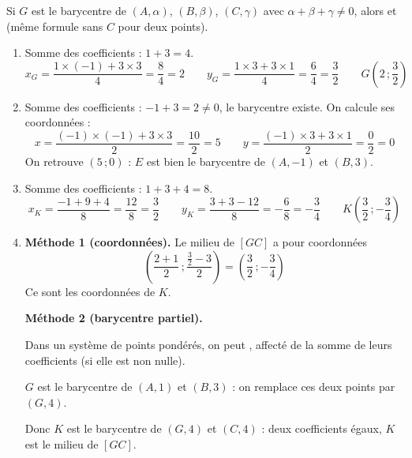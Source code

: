 \begin{center}
\end{center}
\begin{prop}
Si $G$ est le barycentre de $(A,\alpha)$, $(B,\beta)$, $(C,\gamma)$ avec $\alpha+\beta+\gamma\neq0$, alors
 et  (même formule sans $C$ pour deux points).
\end{prop}
\begin{enumerate}[itemsep=14pt]
  \item Somme des coefficients : $1+3=4$.
  \[x_G=\dfrac{1\times(-1)+3\times3}{4}=\dfrac84=2\qquad y_G=\dfrac{1\times3+3\times1}{4}=\dfrac64=\dfrac32\qquad G\left(2\,;\dfrac32\right)\]

  \item Somme des coefficients : $-1+3=2\neq0$, le barycentre existe. On calcule ses coordonnées :
  \[x=\dfrac{(-1)\times(-1)+3\times3}{2}=\dfrac{10}{2}=5\qquad y=\dfrac{(-1)\times3+3\times1}{2}=\dfrac02=0\]
  On retrouve $(5\,;0)$ : $E$ est bien le barycentre de $(A,-1)$ et $(B,3)$.

  \item Somme des coefficients : $1+3+4=8$.
  \[x_K=\dfrac{-1+9+4}{8}=\dfrac{12}{8}=\dfrac32\qquad y_K=\dfrac{3+3-12}{8}=-\dfrac68=-\dfrac34\qquad K\left(\dfrac32\,;-\dfrac34\right)\]

  \item \textbf{Méthode 1 (coordonnées).} Le milieu de $[GC]$ a pour coordonnées
  \[\left(\dfrac{2+1}{2}\,;\dfrac{\frac32-3}{2}\right)=\left(\dfrac32\,;-\dfrac34\right)\]
  Ce sont les coordonnées de $K$.

  \textbf{Méthode 2 (barycentre partiel).}
  \begin{prop}[Associativité]
  Dans un système de points pondérés, on peut , affecté de la somme de leurs coefficients (si elle est non nulle).
  \end{prop}
  $G$ est le barycentre de $(A,1)$ et $(B,3)$ : on remplace ces deux points par $(G,4)$.

  Donc $K$ est le barycentre de $(G,4)$ et $(C,4)$ : deux coefficients égaux, $K$ est le milieu de $[GC]$.
\end{enumerate}
